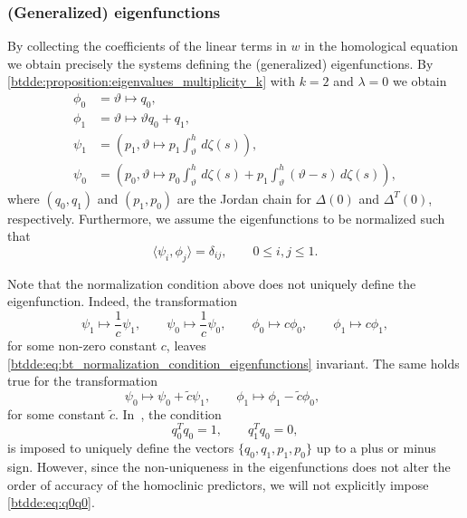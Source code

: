 \subsubsection{(Generalized) eigenfunctions}
By collecting the coefficients of the linear terms in $w$ in the
homological equation we obtain precisely the systems
defining the (generalized) eigenfunctions. By
\cref{btdde:proposition:eigenvalues_multiplicity_k} with $k=2$ and $\lambda=0$ we
obtain
\begin{align*}
    \phi_0  & =  \vartheta \mapsto q_0, \\
    \phi_1  & =  \vartheta \mapsto \vartheta q_0 + q_1, \\
    \psi_1 & = \left( p_1, \vartheta \mapsto p_1 \int_\vartheta^h \, d\zeta(s) \right), \nonumber \\
    \psi_0 & = \left( p_0, \vartheta \mapsto p_0 \int_\vartheta^h \, d\zeta(s)
                            + p_1 \int_{\vartheta}^h (\vartheta-s)\,d\zeta(s) \right),\nonumber 
\end{align*}
where $(q_0,q_1)$ and $(p_1,p_0)$ are the Jordan chain for $\Delta(0)$ and $\Delta^T(0)$, respectively.
Furthermore, we assume the eigenfunctions to be normalized such that
\begin{equation}
    \label{btdde:eq:bt_normalization_condition_eigenfunctions}
    \langle\psi_i,\phi_j\rangle = \delta_{ij}, \qquad 0\leq i,j \leq 1.
\end{equation}

\begin{remark}
Note that the normalization condition above does not uniquely define the eigenfunction. Indeed,
the transformation
\begin{equation}
    \psi_1 \mapsto \frac1c \psi_1, \qquad
    \psi_0 \mapsto \frac1c \psi_0, \qquad
    \phi_0 \mapsto c \phi_0, \qquad
    \phi_1 \mapsto c \phi_1,
\end{equation}
for some non-zero constant $c$, leaves \cref{btdde:eq:bt_normalization_condition_eigenfunctions} invariant.
The same holds true for the transformation
\begin{equation}
    \psi_0 \mapsto \psi_0 + \tilde c \psi_1, \qquad
    \phi_1 \mapsto \phi_1 - \tilde c \phi_0, \qquad
\end{equation}
for some constant $\tilde c$. In~\cite{Kuznetsov2005practical}, the condition
\begin{equation}
\label{btdde:eq:q0q0} 
q_0^T q_0 = 1,\qquad q_1^T q_0 = 0,
\end{equation}
is imposed to uniquely define the vectors $\{q_0,q_1,p_1,p_0\}$ up to a plus or
minus sign. However, since the non-uniqueness in the eigenfunctions does not alter the
order of accuracy of the homoclinic predictors, we will not explicitly impose \cref{btdde:eq:q0q0}.
\end{remark}


